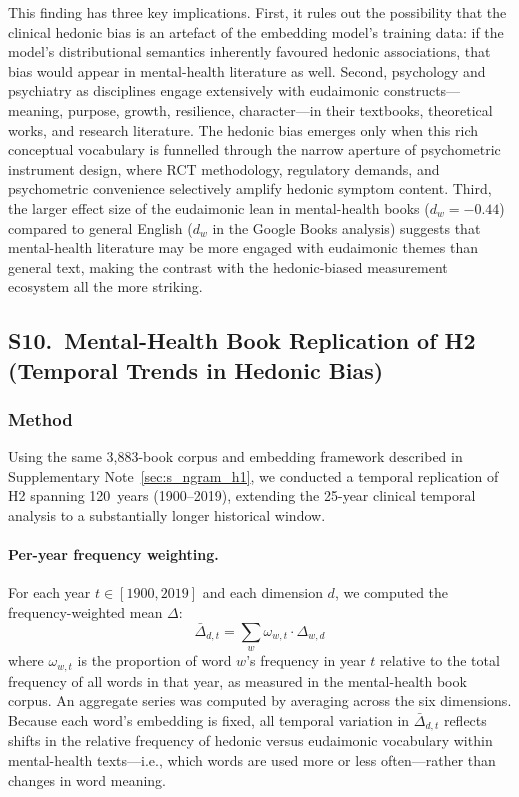 \documentclass[12pt,a4paper]{article}
\begin{document}
This finding has three key implications.
First, it rules out the possibility that the clinical hedonic bias is an artefact of the embedding model's training data: if the model's distributional semantics inherently favoured hedonic associations, that bias would appear in mental-health literature as well.
Second, psychology and psychiatry as disciplines engage extensively with eudaimonic constructs---meaning, purpose, growth, resilience, character---in their textbooks, theoretical works, and research literature.
The hedonic bias emerges only when this rich conceptual vocabulary is funnelled through the narrow aperture of psychometric instrument design, where RCT methodology, regulatory demands, and psychometric convenience selectively amplify hedonic symptom content.
Third, the larger effect size of the eudaimonic lean in mental-health books ($d_w = -0.44$) compared to general English ($d_w$ in the Google Books analysis) suggests that mental-health literature may be more engaged with eudaimonic themes than general text, making the contrast with the hedonic-biased measurement ecosystem all the more striking.

\clearpage
\subsection*{S10.\ Mental-Health Book Replication of H2 (Temporal Trends in Hedonic Bias)}
\label{sec:s_ngram_h2}

\subsubsection*{Method}

Using the same 3{,}883-book corpus and embedding framework described in Supplementary Note~\ref{sec:s_ngram_h1}, we conducted a temporal replication of H2 spanning 120~years (1900--2019), extending the 25-year clinical temporal analysis to a substantially longer historical window.

\paragraph{Per-year frequency weighting.}
For each year $t \in [1900, 2019]$ and each dimension $d$, we computed the frequency-weighted mean $\Delta$:
\[
\bar{\Delta}_{d,t} = \sum_{w} \omega_{w,t} \cdot \Delta_{w,d}
\]
where $\omega_{w,t}$ is the proportion of word $w$'s frequency in year $t$ relative to the total frequency of all words in that year, as measured in the mental-health book corpus.
An aggregate series was computed by averaging across the six dimensions.
Because each word's embedding is fixed, all temporal variation in $\bar{\Delta}_{d,t}$ reflects shifts in the relative frequency of hedonic versus eudaimonic vocabulary within mental-health texts---i.e., which words are used more or less often---rather than changes in word meaning.
\end{document}

